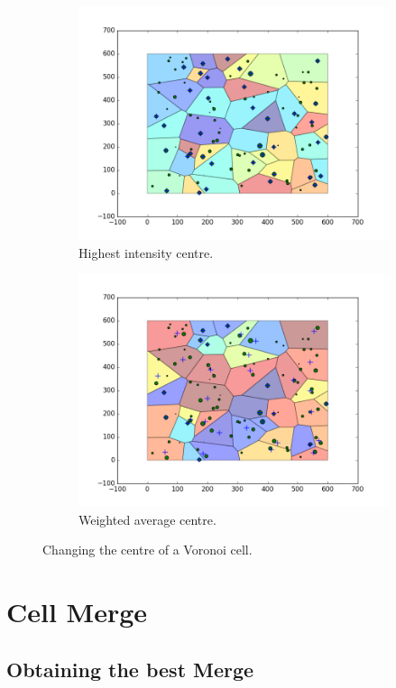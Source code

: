 \begin{figure}
\begin{subfigure}[b]{0.5\textwidth}
  \includegraphics[width=\textwidth]{Images/recentre1.png}
  \caption{Highest intensity centre.}
  \label{fig:recen1}
\end{subfigure}
\hfill
\begin{subfigure}[b]{0.5\textwidth}
  \includegraphics[width=\textwidth]{Images/recentre2.png}
  \caption{Weighted average centre.}
  \label{fig:recen2}
\end{subfigure}
\caption{Changing the centre of a Voronoi cell.}
\label{fig:recentre}
\end{figure}

\section{Cell Merge}

\subsection{Obtaining the best Merge}
